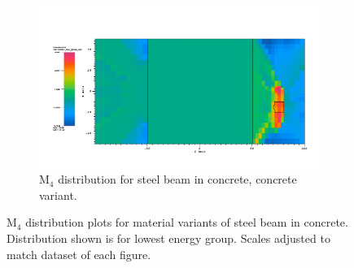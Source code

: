 \begin{figure}[htb!]\ContinuedFloat
  \centering
  \begin{subfigure}[t]{\textwidth}
    \includegraphics[width=0.9\linewidth]{./chapters/characterization_probs/figures/char/prob1v2/prob1v2M4G26.png}
    \caption{M$_4$ distribution for steel beam in concrete, concrete variant.}
    \label{fig:M4concrete}
  \end{subfigure}
  \caption[M$_4$ distribution plots for material variants of steel beam in
  concrete.]{M$_4$ distribution plots for material variants of steel beam in
  concrete. Distribution shown is for lowest energy group. Scales adjusted to
  match dataset of each figure.}
  \label{fig:M2beamplots}
\end{figure}




